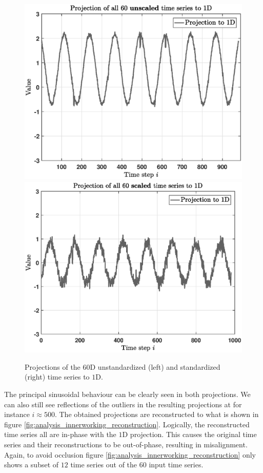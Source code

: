 \begin{figure}[h]
	\centering
	\vspace{-0.12cm}
	\includegraphics[scale=0.345]{analysis/Analysis_unscaled_projection}
	\includegraphics[scale=0.345]{analysis/Analysis_scaled_projection}
	\vspace{-0.12cm}
	\caption{Projections of the $60$D unstandardized (left) and standardized (right) time series to $1$D.}
	\label{fig:analysis_innerworking_projection}
	\vspace{-0.25cm}
\end{figure}

The principal sinusoidal behaviour can be clearly seen in both projections. We can also still see reflections of the outliers in the resulting projections at for instance $i \approx 500$. The obtained projections are reconstructed to what is shown in figure \ref{fig:analysis_innerworking_reconstruction}. Logically, the reconstructed time series all are in-phase with the $1$D projection. This causes the original time series and their reconstructions to be out-of-phase, resulting in misalignment. Again, to avoid occlusion figure \ref{fig:analysis_innerworking_reconstruction} only shows a subset of $12$ time series out of the $60$ input time series.

